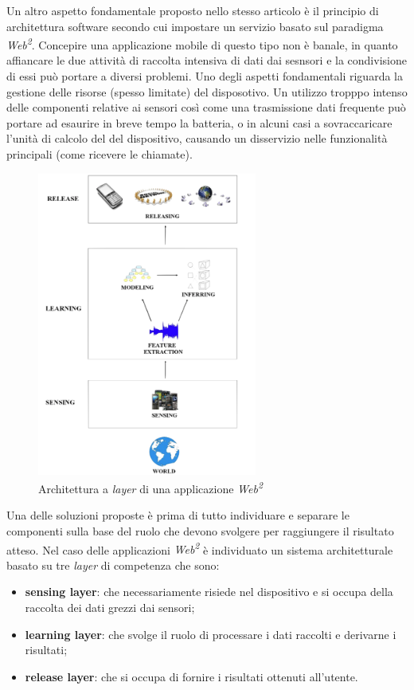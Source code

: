 \documentclass[a4paper, 12pt, twoside, openright]{book}
\begin{document}
Un altro aspetto fondamentale proposto nello stesso articolo è il principio di architettura software secondo cui impostare un servizio basato sul paradigma \emph{Web\textsuperscript{2}}. Concepire una applicazione mobile di questo tipo non è banale, in quanto affiancare le due attività di raccolta intensiva di dati dai sesnsori e la condivisione di essi può portare a diversi problemi. Uno degli aspetti fondamentali riguarda la gestione delle risorse (spesso limitate) del disposotivo. Un utilizzo tropppo intenso delle componenti relative ai sensori così come una trasmissione dati frequente può portare ad esaurire in breve tempo la batteria, o in alcuni casi a sovraccaricare l'unità di calcolo del del dispositivo, causando un disservizio nelle funzionalità principali (come ricevere le chiamate). 
\begin{figure}[h]
  \centering
  \includegraphics[height=10cm]{images/layers}
  \caption{\footnotesize{Architettura a \emph{layer} di una applicazione \emph{Web\textsuperscript{2}}}}
  \label{fig:layers}
\end{figure}
Una delle soluzioni proposte è prima di tutto individuare e separare le componenti sulla base del ruolo che devono svolgere per raggiungere il risultato atteso. Nel caso delle applicazioni \emph{Web\textsuperscript{2}} è individuato un sistema architetturale basato su tre \emph{layer} di competenza che sono:
\begin{itemize}
  \item \textbf{sensing layer}: che necessariamente risiede nel dispositivo e si occupa della raccolta dei dati grezzi dai sensori;
  \item \textbf{learning layer}: che svolge il ruolo di processare i dati raccolti e derivarne i risultati;
  \item \textbf{release layer}: che si occupa di fornire i risultati ottenuti all'utente.
\end{itemize}
\end{document}
